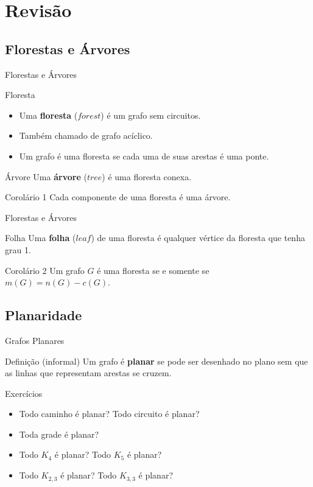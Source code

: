 \documentclass[xcolor=dvipsnames,table]{beamer}
\begin{document}
    \section{Revisão}
	\subsection{Florestas e Árvores}
	\begin{frame}{Florestas e Árvores}
		\begin{block}{Floresta}
			\begin{itemize}
				\item Uma {\bf floresta} ($forest$) é um grafo sem circuitos.
				\item Também chamado de grafo acíclico. 
				\item Um grafo é uma floresta se cada uma de suas arestas é uma ponte. 
			\end{itemize}
		\end{block}
		\begin{block}{Árvore}
			Uma {\bf árvore} ($tree$) é uma floresta conexa. 
		\end{block}
		\begin{block}{Corolário 1}
			Cada componente de uma floresta é uma árvore.
		\end{block}
	\end{frame}
	
	\begin{frame}{Florestas e Árvores}
		\begin{block}{Folha}
			Uma {\bf folha} ($leaf$) de uma floresta é qualquer vértice da floresta que tenha grau 1.
		\end{block}
		\begin{block}{Corolário 2}
			Um grafo $G$ é uma floresta se e somente se $m(G) = n(G) - c(G)$.
		\end{block}
	\end{frame}
	
	\subsection{Planaridade}
	\begin{frame}{Grafos Planares}
		\begin{block}{Definição (informal)}
			Um grafo é {\bf planar} se pode ser desenhado no plano sem que as linhas que representam arestas se cruzem.
		\end{block}
		\begin{block}{Exercícios}
			\begin{itemize}
				\item Todo caminho é planar? Todo circuito é planar? 
				\item Toda grade é planar? 
				\item Todo $K_4$ é planar? Todo $K_5$ é planar?
				\item Todo $K_{2,3}$ é planar? Todo $K_{3,3}$ é planar?
			\end{itemize}
		\end{block}
	\end{frame}
	
\end{document}
